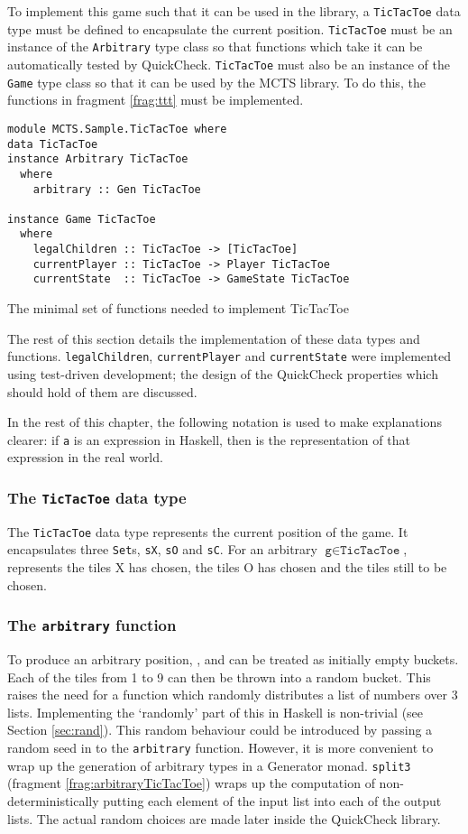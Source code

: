 To implement this game such that it can be used in the library, a \texttt{TicTacToe} data type must be defined to encapsulate the current position. \texttt{TicTacToe} must be an instance of the \texttt{Arbitrary} type class so that functions which take it can be automatically tested by {QuickCheck}. \texttt{TicTacToe} must also be an instance of the \texttt{Game} type class so that it can be used by the {MCTS} library. To do this, the functions in fragment \ref{frag:ttt} must be implemented.
\begin{fragment}
\begin{lstlisting}
module MCTS.Sample.TicTacToe where
data TicTacToe
instance Arbitrary TicTacToe 
  where
    arbitrary :: Gen TicTacToe
   
instance Game TicTacToe
  where
    legalChildren :: TicTacToe -> [TicTacToe]
    currentPlayer :: TicTacToe -> Player TicTacToe
    currentState  :: TicTacToe -> GameState TicTacToe
\end{lstlisting}
\caption{\label{frag:ttt}The minimal set of functions needed to implement {TicTacToe}}
\end{fragment}

The rest of this section details the implementation of these data types and functions. \texttt{legalChildren}, \texttt{currentPlayer} and \texttt{currentState} were implemented using test-driven development; the design of the QuickCheck properties which should hold of them are discussed.

In the rest of this chapter, the following notation is used to make explanations clearer: if \texttt{a} is an expression in Haskell, then  is the representation of that expression in the real world.
\subsubsection{The \texttt{TicTacToe} data type}
The \texttt{TicTacToe} data type represents the current position of the game. It encapsulates three \texttt{Set}s, \texttt{sX}, \texttt{sO} and \texttt{sC}. For an arbitrary $\texttt{g}\in\texttt{TicTacToe}$,  represents the tiles X has chosen,  the tiles O has chosen and  the tiles still to be chosen.

\subsubsection{The \texttt{arbitrary} function}
To produce an arbitrary position, ,  and  can be treated as initially empty buckets. Each of the tiles from 1 to 9 can then be thrown into a random bucket. This raises the need for a function which randomly distributes a list of numbers over 3 lists. Implementing the `randomly' part of this in Haskell is non-trivial (see Section \ref{sec:rand}). This random behaviour could be introduced by passing a random seed in to the \texttt{arbitrary} function. However, it is more convenient to wrap up the generation of arbitrary types in a {Generator monad}. \texttt{split3} (fragment \ref{frag:arbitraryTicTacToe}) wraps up the computation of non-deterministically putting each element of the input list into each of the output lists. The actual random choices are made later inside the {QuickCheck} library.

